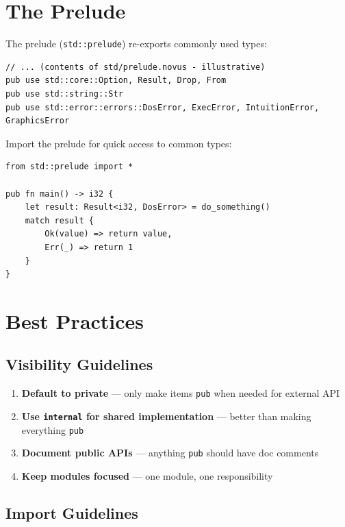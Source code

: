 \section{The Prelude}
\label{sec:prelude}

The prelude (\texttt{std::prelude}) re-exports commonly used types:

\begin{lstlisting}
// ... (contents of std/prelude.novus - illustrative)
pub use std::core::Option, Result, Drop, From
pub use std::string::Str
pub use std::error::errors::DosError, ExecError, IntuitionError, GraphicsError
\end{lstlisting}

Import the prelude for quick access to common types:

\begin{lstlisting}
from std::prelude import *

pub fn main() -> i32 {
    let result: Result<i32, DosError> = do_something()
    match result {
        Ok(value) => return value,
        Err(_) => return 1
    }
}
\end{lstlisting}

\section{Best Practices}
\label{sec:module-best-practices}

\subsection{Visibility Guidelines}
\label{subsec:visibility-guidelines}

\begin{enumerate}
    \item \textbf{Default to private} --- only make items \texttt{pub} when needed for external API
    \item \textbf{Use \texttt{internal} for shared implementation} --- better than making everything \texttt{pub}
    \item \textbf{Document public APIs} --- anything \texttt{pub} should have doc comments
    \item \textbf{Keep modules focused} --- one module, one responsibility
\end{enumerate}

\subsection{Import Guidelines}
\label{subsec:import-guidelines}

